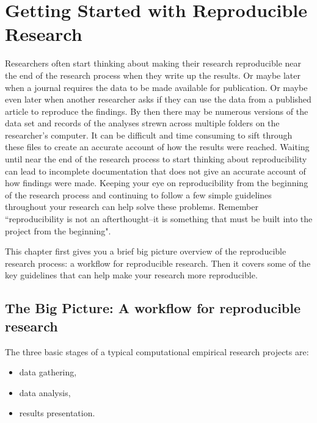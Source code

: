 



\chapter{Getting Started with Reproducible Research}\label{GettingStartedRR}

Researchers often start thinking about making their research reproducible near the end of the research process when they write up the results. Or maybe later when a journal requires the data to be made available for publication. Or maybe even later when another researcher asks if they can use the data from a published article to reproduce the findings. By then there may be numerous versions of the data set and records of the analyses strewn across multiple folders on the researcher's computer. It can be difficult and time consuming to sift through these files to create an accurate account of how the results were reached. Waiting until near the end of the research process to start thinking about reproducibility can lead to incomplete documentation that does not give an accurate account of how findings were made. Keeping your eye on reproducibility from the beginning of the research process and continuing to follow a few simple guidelines throughout your research can help solve these problems. Remember ``reproducibility is not an afterthought--it is something that must be built into the project from the beginning"\cite[386]{Donoho2010}.

This chapter first gives you a brief big picture overview of the reproducible research process: a workflow for reproducible research. Then it covers some of the key guidelines that can help make your research more reproducible.

\section{The Big Picture: A workflow for reproducible research}

The three basic stages of a typical computational empirical research projects are:

\begin{itemize}
    \item data gathering,
    \item data analysis,
    \item results presentation.
\end{itemize}


